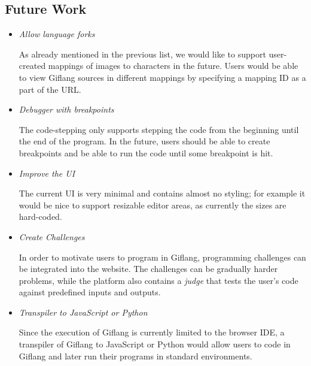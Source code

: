 \subsection*{Future Work}
\begin{itemize}
   \item \emph{Allow language forks}

      As already mentioned in the previous list, we would like to support user-created mappings of images to characters in the future. Users would be able
      to view Giflang sources in different mappings by specifying a mapping ID as a part of the URL.

   \item \emph{Debugger with breakpoints}

      The code-stepping only supports stepping the code from the beginning until the end of the program. In the future, users should be able to create breakpoints
      and be able to run the code until some breakpoint is hit.
   \newpage
   \item \emph{Improve the UI}

      The current UI is very minimal and contains almost no styling; for example it would be nice to support resizable editor areas, as currently the sizes
      are hard-coded.
   \item \emph{Create Challenges} 

      In order to motivate users to program in Giflang, programming challenges can be integrated into the website. The challenges can be gradually harder problems,
      while the platform also contains a \emph{judge} that tests the user's code against predefined inputs and outputs.
   \item \emph{Transpiler to JavaScript or Python}

      Since the execution of Giflang is currently limited to the browser IDE, a transpiler of Giflang to JavaScript or Python would allow users to code in Giflang
      and later run their programs in standard environments. 
\end{itemize}
